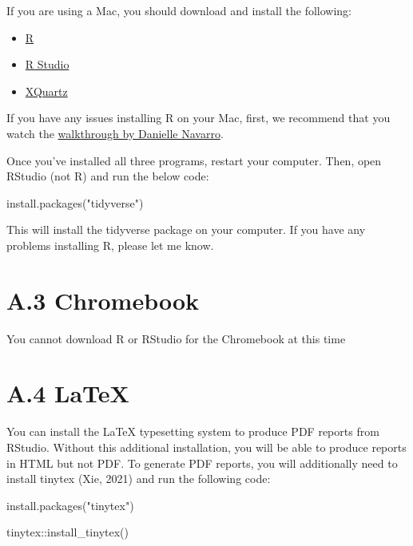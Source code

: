 \documentclass[
]{book}
\newenvironment{Shaded}{\begin{snugshade}}{\end{snugshade}}
\newcommand{\FunctionTok}[1]{\textcolor[rgb]{0.00,0.00,0.00}{#1}}
\newcommand{\NormalTok}[1]{#1}
\newcommand{\SpecialCharTok}[1]{\textcolor[rgb]{0.00,0.00,0.00}{#1}}
\newcommand{\StringTok}[1]{\textcolor[rgb]{0.31,0.60,0.02}{#1}}
\begin{document}
If you are using a Mac, you should download and install the following:

\begin{itemize}
\item
  \href{https://www.stats.bris.ac.uk/R/}{R}
\item
  \href{https://www.rstudio.com/products/rstudio/download/\#download}{R Studio}
\item
  \href{https://www.xquartz.org/}{XQuartz}
\end{itemize}

If you have any issues installing R on your Mac, first, we recommend that you watch the \href{https://www.youtube.com/watch?v=ay25o485YXs\&list=PLRPB0ZzEYegOZivdelOuEn-R-XUN-DOjd\&index=1\&t=113s}{walkthrough by Danielle Navarro}.

Once you've installed all three programs, restart your computer. Then, open RStudio (not R) and run the below code:

\begin{Shaded}
\begin{Highlighting}[]
\FunctionTok{install.packages}\NormalTok{(}\StringTok{"tidyverse"}\NormalTok{)}
\end{Highlighting}
\end{Shaded}

This will install the tidyverse package on your computer. If you have any problems installing R, please let me know.

\hypertarget{a.3-chromebook}{%
\section{A.3 Chromebook}\label{a.3-chromebook}}

You cannot download R or RStudio for the Chromebook at this time

\hypertarget{a.4-latex}{%
\section{A.4 LaTeX}\label{a.4-latex}}

You can install the LaTeX typesetting system to produce PDF reports from RStudio. Without this additional installation, you will be able to produce reports in HTML but not PDF. To generate PDF reports, you will additionally need to install tinytex (Xie, 2021) and run the following code:

\begin{Shaded}
\begin{Highlighting}[]
\FunctionTok{install.packages}\NormalTok{(}\StringTok{"tinytex"}\NormalTok{)}

\NormalTok{tinytex}\SpecialCharTok{::}\FunctionTok{install\_tinytex}\NormalTok{()}
\end{Highlighting}
\end{Shaded}
\end{document}
